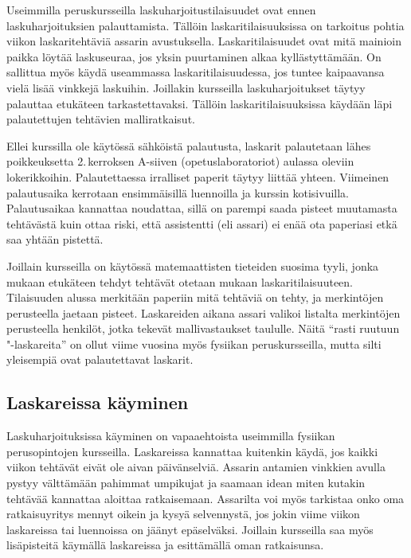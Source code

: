 \documentclass[../ala_hataile.tex]{subfiles}
\begin{document}
	Useimmilla perus\-kursseilla lasku\-harjoitus\-tilaisuudet ovat ennen lasku\-harjoituksien palauttamista. Tällöin laskari\-tilaisuuksissa on tarkoitus pohtia viikon laskari\-tehtäviä assarin avustuksella. Laskari\-tilaisuudet ovat mitä mainioin paikka löytää lasku\-seuraa, jos yksin puurtaminen alkaa kyllästyttämään. On sallittua myös käydä useammassa laskari\-tilaisuudessa, jos tuntee kaipaavansa vielä lisää vinkkejä laskuihin. Joillakin kursseilla lasku\-harjoitukset täytyy palauttaa
	etukäteen tarkastettavaksi. Tällöin laskari\-tilaisuuksissa käydään läpi palautettujen tehtävien malli\-ratkaisut.
	
	Ellei kurssilla ole käytössä sähköistä palautusta, laskarit palautetaan
	lähes poikkeuksetta 2.\,kerroksen
	A-siiven (opetus\-laboratoriot) aulassa oleviin
	lokerikkoihin. Palautettaessa irralliset
	paperit täytyy liittää yhteen. Viimeinen
	palautus\-aika kerrotaan ensimmäisillä luennoilla ja kurssin koti\-sivuilla. Palautus\-aikaa
	kannattaa noudattaa, sillä on parempi saada
	pisteet muutamasta tehtävästä kuin ottaa
	riski, että assistentti (eli assari) ei enää ota
	paperiasi etkä saa yhtään pistettä.
	
	Joillain kursseilla on käytössä matemaattisten tieteiden suosima tyyli, jonka
	mukaan etukäteen tehdyt tehtävät otetaan
	mukaan laskari\-tilaisuuteen. Tilaisuuden
	alussa merkitään paperiin mitä tehtäviä on
	tehty, ja merkintöjen perusteella jaetaan
	pisteet. Laskareiden aikana assari valikoi
	listalta merkintöjen perusteella henkilöt,
	jotka tekevät malli\-vastaukset taululle. Näitä
	``rasti ruutuun "-laskareita'' on ollut viime vuosina
	myös fysiikan perus\-kursseilla, mutta silti
	yleisempiä ovat palautettavat laskarit.
	
	\subsection*{Laskareissa käyminen}
	Lasku\-harjoituksissa käyminen on vapaa\-ehtoista
	useimmilla fysiikan perus\-opintojen kursseilla. Laskareissa kannattaa
	kuitenkin käydä, jos kaikki viikon tehtävät eivät ole aivan päivän\-selviä. Assarin antamien vinkkien avulla pystyy välttämään pahimmat umpikujat ja saamaan idean miten kutakin tehtävää kannattaa aloittaa ratkaisemaan. Assarilta voi myös tarkistaa onko oma ratkaisu\-yritys mennyt oikein ja kysyä selvennystä, jos jokin viime viikon laskareissa tai luennoissa on jäänyt epäselväksi. Joillain kursseilla saa myös
	lisä\-pisteitä käymällä laskareissa ja esittämällä
	oman ratkaisunsa.
	
\end{document}
